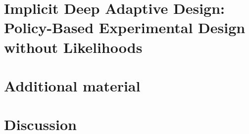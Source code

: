 \documentclass[a4paper, 10pt]{report}
\theoremstyle{plain}
\theoremstyle{definition}
\theoremstyle{remark}
\begin{document}
	\chapter{Implicit Deep Adaptive Design: Policy-Based Experimental Design without Likelihoods}
	\label{chap:idad}
	
	\chapter{Additional material}
	\label{chap:additional}
	
	
	
	\chapter{Discussion}
	\label{chap:discussion}
	
	
	
\end{document}
